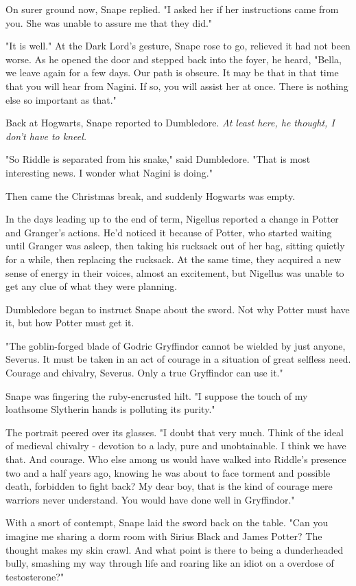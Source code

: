 On surer ground now, Snape replied. "I asked her if her instructions came from you. She was unable to assure me that they did."

"It is well." At the Dark Lord's gesture, Snape rose to go, relieved it had not been worse. As he opened the door and stepped back into the foyer, he heard, "Bella, we leave again for a few days. Our path is obscure. It may be that in that time that you will hear from Nagini. If so, you will assist her at once. There is nothing else so important as that."

Back at Hogwarts, Snape reported to Dumbledore. \emph{At least here, he thought, I don't have to kneel.}

"So Riddle is separated from his snake," said Dumbledore. "That is most interesting news. I wonder what Nagini is doing."

Then came the Christmas break, and suddenly Hogwarts was empty.

In the days leading up to the end of term, Nigellus reported a change in Potter and Granger's actions. He'd noticed it because of Potter, who started waiting until Granger was asleep, then taking his rucksack out of her bag, sitting quietly for a while, then replacing the rucksack. At the same time, they acquired a new sense of energy in their voices, almost an excitement, but Nigellus was unable to get any clue of what they were planning.

Dumbledore began to instruct Snape about the sword. Not why Potter must have it, but how Potter must get it.

"The goblin-forged blade of Godric Gryffindor cannot be wielded by just anyone, Severus. It must be taken in an act of courage in a situation of great selfless need. Courage and chivalry, Severus. Only a true Gryffindor can use it."

Snape was fingering the ruby-encrusted hilt. "I suppose the touch of my loathsome Slytherin hands is polluting its purity."

The portrait peered over its glasses. "I doubt that very much. Think of the ideal of medieval chivalry - devotion to a lady, pure and unobtainable. I think we have that. And courage. Who else among us would have walked into Riddle's presence two and a half years ago, knowing he was about to face torment and possible death, forbidden to fight back? My dear boy, that is the kind of courage mere warriors never understand. You would have done well in Gryffindor."

With a snort of contempt, Snape laid the sword back on the table. "Can you imagine me sharing a dorm room with Sirius Black and James Potter? The thought makes my skin crawl. And what point is there to being a dunderheaded bully, smashing my way through life and roaring like an idiot on a overdose of testosterone?"

